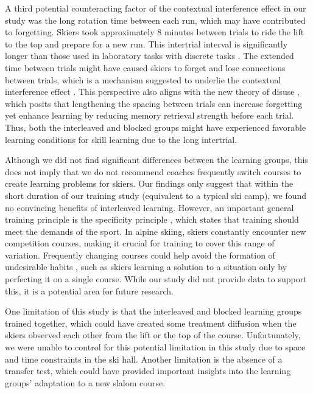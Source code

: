 A third potential counteracting factor of the contextual interference effect in our study was the long rotation time between each run, which may have contributed to forgetting. Skiers took approximately 8 minutes between trials to ride the lift to the top and prepare for a new run. This intertrial interval is significantly longer than those used in laboratory tasks with discrete tasks \cite{barreiros_contextual_2007}. The extended time between trials might have caused skiers to forget and lose connections between trials, which is a mechanism suggested to underlie the contextual interference effect \cite{lee_locus_1983, lee_can_1985}. This perspective also aligns with the new theory of disuse \cite{bjork_new_1992}, which posits that lengthening the spacing between trials can increase forgetting yet enhance learning by reducing memory retrieval strength before each trial. Thus, both the interleaved and blocked groups might have experienced favorable learning conditions for skill learning due to the long intertrial.

Although we did not find significant differences between the learning groups, this does not imply that we do not recommend coaches frequently switch courses to create learning problems for skiers. Our findings only suggest that within the short duration of our training study (equivalent to a typical ski camp), we found no convincing benefits of interleaved learning. However, an important general training principle is the specificity principle \cite{lee_chapter_1988}, which states that training should meet the demands of the sport. In alpine skiing, skiers constantly encounter new competition courses, making it crucial for training to cover this range of variation. Frequently changing courses could help avoid the formation of undesirable habits \cite{du_relationship_2022}, such as skiers learning a solution to a situation only by perfecting it on a single course. While our study did not provide data to support this, it is a potential area for future research.

One limitation of this study is that the interleaved and blocked learning groups trained together, which could have created some treatment diffusion when the skiers observed each other from the lift or the top of the course. Unfortunately, we were unable to control for this potential limitation in this study due to space and time constraints in the ski hall. Another limitation is the absence of a transfer test, which could have provided important insights into the learning groups’ adaptation to a new slalom course.

